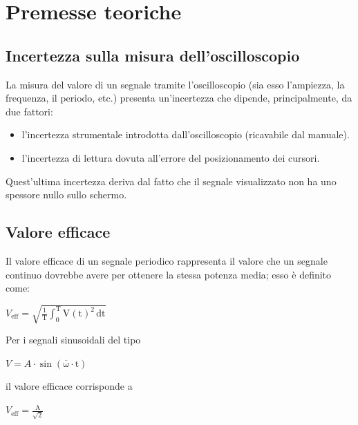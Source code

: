 \documentclass{article}
\begin{document}
	\section{Premesse teoriche}
		\subsection{Incertezza sulla misura dell'oscilloscopio}
			La misura del valore di un segnale tramite l’oscilloscopio (sia esso l'ampiezza, la frequenza, il periodo, etc.) presenta un'incertezza che dipende, principalmente, da due fattori:
			\begin{itemize}
				\item l’incertezza strumentale introdotta dall’oscilloscopio (ricavabile dal manuale).
				\item l’incertezza di lettura dovuta all’errore del posizionamento dei cursori.
			\end{itemize}
			Quest’ultima incertezza deriva dal fatto che il segnale visualizzato non ha uno spessore nullo sullo schermo.
		\subsection{Valore efficace}
			Il valore efficace di un segnale periodico rappresenta il valore che un segnale continuo dovrebbe avere per ottenere la stessa potenza media; esso è definito come:
			\newline
			\begin{center}
				$ V_{\mathrm{eff}} = \mathrm{\sqrt{\frac{1}{T} \int_{0}^{T} V(t)^{2} \, dt}} $
			\end{center}
			\newline
			Per i segnali sinusoidali del tipo
			\newline
			\begin{center}
				$ V = A \cdot \mathrm{\sin(\overline{\omega} \cdot t)} $
			\end{center}
			il valore efficace corrisponde a
			\newline
			\begin{center}
				$ V_{\mathrm{eff}} = \mathrm{\frac{A}{\sqrt{2}}} $
			\end{center}
\end{document}
